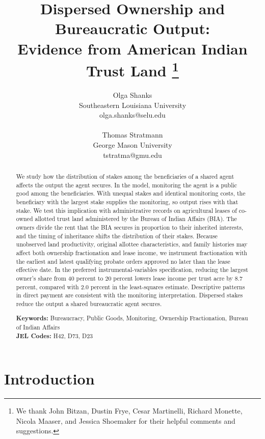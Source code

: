 \documentclass[12pt]{article}
\title{\large\textbf{Dispersed Ownership and Bureaucratic Output: \\ Evidence from American Indian Trust Land} 
\thanks{We thank John Bitzan, Dustin Frye, Cesar Martinelli, Richard Monette, Nicola Maaser, and Jessica Shoemaker for their helpful comments and suggestions.}}
\author{
    Olga Shanks\\
    Southeastern Louisiana University\\
    olga.shanks@selu.edu\\
    \vspace{-2mm}\\
    Thomas Stratmann\\
    George Mason University\\
    tstratma@gmu.edu
}
\date{\monthyear}
\begin{document}
\maketitle


\thispagestyle{empty}
{\singlespacing %
\begin{abstract}\noindent
We study how the distribution of stakes among the beneficiaries of a shared agent affects the output the agent secures. In the model, monitoring the agent is a public good among the beneficiaries. With unequal stakes and identical monitoring costs, the beneficiary with the largest stake supplies the monitoring, so output rises with that stake. We test this implication with administrative records on agricultural leases of co-owned allotted trust land administered by the Bureau of Indian Affairs (BIA). The owners divide the rent that the BIA secures in proportion to their inherited interests, and the timing of inheritance shifts the distribution of their stakes. Because unobserved land productivity, original allottee characteristics, and family histories may affect both ownership fractionation and lease income, we instrument fractionation with the earliest and latest qualifying probate orders approved no later than the lease effective date. In the preferred instrumental-variables specification, reducing the largest owner's share from 40 percent to 20 percent lowers lease income per trust acre by 8.7 percent, compared with 2.0 percent in the least-squares estimate. Descriptive patterns in direct payment are consistent with the monitoring interpretation. Dispersed stakes reduce the output a shared bureaucratic agent secures.



\vspace{\baselineskip}
\noindent
\textbf{Keywords:} Bureaucracy, Public Goods, Monitoring, Ownership Fractionation, Bureau of Indian Affairs\\
\textbf{JEL Codes:} H42, D73, D23

\end{abstract}
} %



\pagebreak
\setcounter{page}{1}


\section{Introduction}
\end{document}
